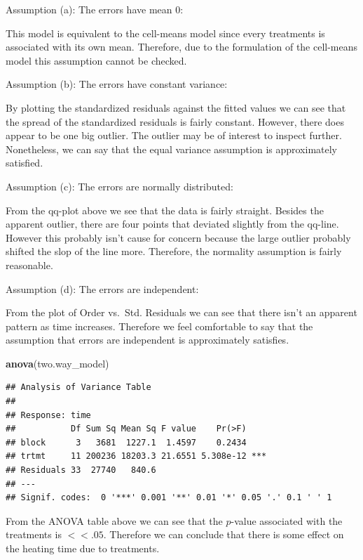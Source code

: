 \documentclass[12pt,]{article}
\newenvironment{Shaded}{\begin{snugshade}}{\end{snugshade}}
\newcommand{\KeywordTok}[1]{\textcolor[rgb]{0.13,0.29,0.53}{\textbf{#1}}}
\newcommand{\NormalTok}[1]{#1}
\begin{document}
Assumption (a): The errors have mean 0:

This model is equivalent to the cell-means model since every treatments
is associated with its own mean. Therefore, due to the formulation of
the cell-means model this assumption cannot be checked.

Assumption (b): The errors have constant variance:

By plotting the standardized residuals against the fitted values we can
see that the spread of the standardized residuals is fairly constant.
However, there does appear to be one big outlier. The outlier may be of
interest to inspect further. Nonetheless, we can say that the equal
variance assumption is approximately satisfied.

Assumption (c): The errors are normally distributed:

From the qq-plot above we see that the data is fairly straight. Besides
the apparent outlier, there are four points that deviated slightly from
the qq-line. However this probably isn't cause for concern because the
large outlier probably shifted the slop of the line more. Therefore, the
normality assumption is fairly reasonable.

Assumption (d): The errors are independent:

From the plot of Order vs.~Std. Residuals we can see that there isn't an
apparent pattern as time increases. Therefore we feel comfortable to say
that the assumption that errors are independent is approximately
satisfies.

\begin{Shaded}
\begin{Highlighting}[]
\KeywordTok{anova}\NormalTok{(two.way_model)}
\end{Highlighting}
\end{Shaded}

\begin{verbatim}
## Analysis of Variance Table
## 
## Response: time
##           Df Sum Sq Mean Sq F value    Pr(>F)    
## block      3   3681  1227.1  1.4597    0.2434    
## trtmt     11 200236 18203.3 21.6551 5.308e-12 ***
## Residuals 33  27740   840.6                      
## ---
## Signif. codes:  0 '***' 0.001 '**' 0.01 '*' 0.05 '.' 0.1 ' ' 1
\end{verbatim}

From the ANOVA table above we can see that the \(p\)-value associated
with the treatments is \(<< .05\). Therefore we can conclude that there
is some effect on the heating time due to treatments.
\end{document}
